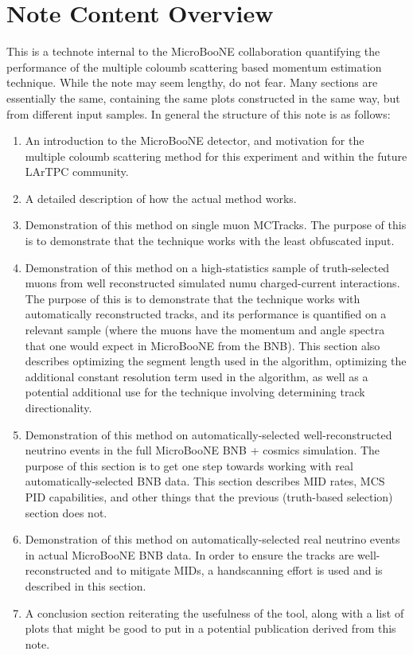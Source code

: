 \documentclass{article}
\begin{document}
\section{Note Content Overview}
This is a technote internal to the MicroBooNE collaboration quantifying the performance of the multiple coloumb scattering based momentum estimation technique. While the note may seem lengthy, do not fear. Many sections are essentially the same, containing the same plots constructed in the same way, but from different input samples. In general the structure of this note is as follows:
\begin{enumerate}
\item An introduction to the MicroBooNE detector, and motivation for the multiple coloumb scattering method for this experiment and within the future LArTPC community.
\item A detailed description of how the actual method works.
\item Demonstration of this method on single muon {\sc MCTracks}. The purpose of this is to demonstrate that the technique works with the least obfuscated input.
\item Demonstration of this method on a high-statistics sample of truth-selected muons from well reconstructed simulated numu charged-current interactions. The purpose of this is to demonstrate that the technique works with automatically reconstructed tracks, and its performance is quantified on a relevant sample (where the muons have the momentum and angle spectra that one would expect in MicroBooNE from the BNB). This section also describes optimizing the segment length used in the algorithm, optimizing the additional constant resolution term used in the algorithm, as well as a potential additional use for the technique involving determining track directionality.
\item Demonstration of this method on automatically-selected well-reconstructed neutrino events in the full MicroBooNE BNB + cosmics simulation. The purpose of this section is to get one step towards working with real automatically-selected BNB data. This section describes MID rates, MCS PID capabilities, and other things that the previous (truth-based selection) section does not.
\item Demonstration of this method on automatically-selected real neutrino events in actual MicroBooNE BNB data. In order to ensure the tracks are well-reconstructed and to mitigate MIDs, a handscanning effort is used and is described in this section.
\item A conclusion section reiterating the usefulness of the tool, along with a list of plots that might be good to put in a potential publication derived from this note.
\end{enumerate}



\clearpage

\clearpage

\clearpage

\clearpage

\clearpage

\clearpage



\clearpage

\end{document}
